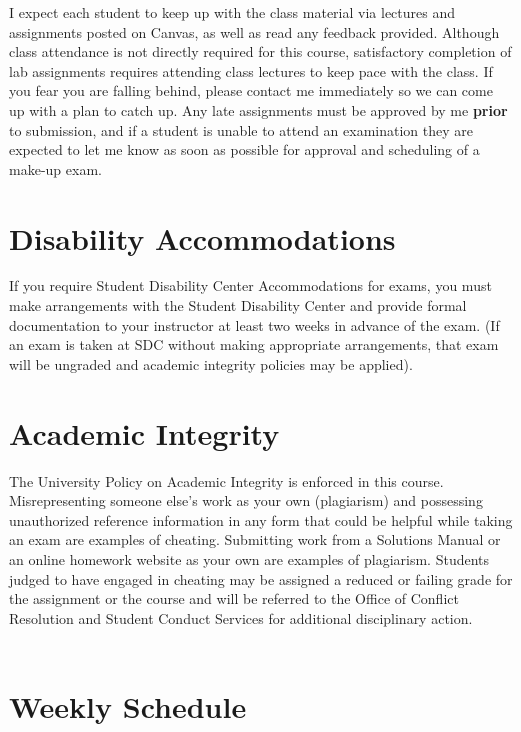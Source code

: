 \documentclass[11pt]{article}
\begin{document}
\noindent I expect each student to keep up with the class material via lectures and assignments posted on Canvas, as well as read any feedback provided. Although class attendance is not directly required for this course, satisfactory completion of lab assignments requires attending class lectures to keep pace with the class. If you fear you are falling behind, please contact me immediately so we can come up with a plan to catch up. Any late assignments must be approved by me \textbf{prior} to submission, and if a student is unable to attend an examination they are expected to let me know as soon as possible for approval and scheduling of a make-up exam.

\section*{Disability Accommodations}
If you require Student Disability Center Accommodations for exams, you must make
arrangements with the Student Disability Center and provide formal documentation to your instructor at
least two weeks in advance of the exam. (If an exam is taken at SDC without making appropriate
arrangements, that exam will be ungraded and academic integrity policies may be applied). 

\section*{Academic Integrity}
The University Policy on Academic Integrity is enforced in this course.
Misrepresenting someone else’s work as your own (plagiarism) and possessing unauthorized reference
information in any form that could be helpful while taking an exam are examples of cheating. Submitting
work from a Solutions Manual or an online homework website as your own are examples of plagiarism.
Students judged to have engaged in cheating may be assigned a reduced or failing grade for the
assignment or the course and will be referred to the Office of Conflict Resolution and Student Conduct
Services for additional disciplinary action. \\
\\



\newpage

\section*{Weekly Schedule}
\end{document}
